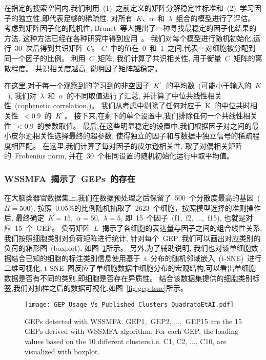 在指定的搜索空间内,我们利用~(1)~之前定义的矩阵分解稳定性标准和~(2)~学习因子的独立性,即代表足够的稀疏性,
对所有~$K$、$\alpha$~和~$\lambda$~组合的模型进行了评估。
考虑到矩阵因子化的随机性, Brunet~等人提出了一种寻找最稳定的因子化结果的方法,
这种方法已经在各种研究中得到应用~\cite{brunet2004metagenes,wu2016stability}。
我们对每个模型进行随机初始化,运行~30~次后得到共识矩阵~$C$。
$C$~中的值在~$0$~和~$1$~之间,代表一对细胞被分配到同一个因子的比例。
利用~$C$~矩阵, 我们计算了共识相关性, 用于衡量~$C$~矩阵的离散程度。
共识相关度越高, 说明因子矩阵越稳定。

在这里,对于每一个观察到的学习到的非空因子~$K^\textup{'}$~的平均数~(可能小于输入的~$K$~),
我们对~$\lambda$~和~$\alpha$~的不同取值进行了汇总,
并计算了中位共线性相关性~(cophenetic correlation,\cite{brunet2004metagenes})。
我们从考虑中剔除了任何对应于~K~的中位共时相关性~$< 0.9$~的~$K^\textup{'}$。
接下来,在剩下的单个设置中,我们排除任何一个共线性相关性~$< 0.9$~的参数取值。
最后,在这些明显稳定的设置中,我们根据因子对之间的最小皮尔逊相关性选择最终的超参数,
使得独立的因子和与数据中独立信号的稀疏程度相匹配。
在这里,我们计算了每对因子的皮尔逊相关性, 取了对偶相关矩阵的~Frobenius norm, 
并在~30~个相同设置的随机初始化运行中取平均值。

\subsubsection{WSSMFA~揭示了~GEPs~的存在}
在大脑类器官数据集上,我们在数据预处理之后保留了~500~个分散度最高的基因~($H = 500$),
按照~0.05\%的比例随机抽取了~2623~个细胞，按照模型选择的准则操作后,
最终确定~$K = 15$,~$\alpha = 50$,~$\lambda = 5$, 
即~15~个因子~(f1,~f2, $\ldots$,~f15), 也就是对应~15~个~GEP。
负荷矩阵~$L$~揭示了各细胞的表达量与因子之间的组合线性关系, 我们按照细胞类别对负荷矩阵进行统计,
针对每个~GEP~我们可以画出对应类别的负荷的箱形图~(boxplot), 如图~\ref{fig:gep-gep}所示。
另外,为了辅助说明, 我们也对该单细胞数据结合已知的细胞的标注类别信息使用基于~t~分布的随机邻域嵌入~(t-SNE)~进行二维可视化,
t-SNE~图反应了单细胞数据中细胞分布的宏观结构,可以看出单细胞数据是否有不同的类别,即细胞是否存在异质性。
结合该数据集提供的细胞类别标签,我们对抽样之后的数据可视化,如图~\ref{fig:gep-tsne}所示。

\begin{figure}[!htbp]
    \centering
    \texttt{[image: GEP\_Usage\_Vs\_Published\_Clusters\_QuadratoEtAI.pdf]}
    \caption{GEPs detected with WSSMFA.
    GEP1,~GEP2, $\ldots$,~GEP15 are the 15 GEPs derived with WSSMFA algorithm.
    For each GEP, the loading values based on the 10 different clusters,i.e. C1, C2, $\ldots$, C10,  are visualized with boxplot.
    }
    \label{fig:gep-gep}
\end{figure}


